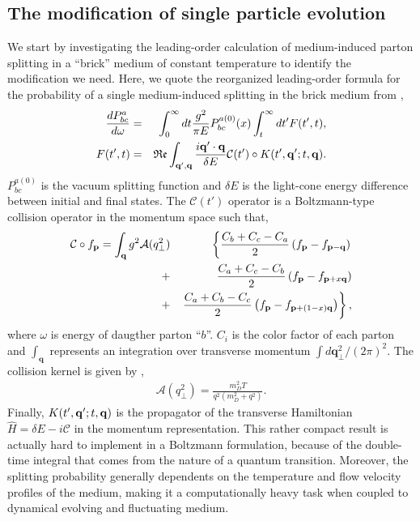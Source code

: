 \documentclass[aps, prc, reprint, amsmath, groupedaddress, nofootinbib]{revtex4-1}
\begin{document}
\subsection{The modification of single particle evolution}
We start by investigating the leading-order calculation of medium-induced parton splitting in a ``brick'' medium of constant temperature to identify the modification we need.
Here, we quote the reorganized leading-order formula for the probability of a single medium-induced splitting in the brick medium from \cite{CaronHuot:2010bp},
\begin{eqnarray}
\frac{dP^{a}_{bc}}{d\omega} &=& \int_0^\infty dt \frac{g^2}{\pi E} P_{bc}^{a(0)}(x) \int_t^\infty dt'  F(t', t),
\label{eq:full-theory}
\\
F(t', t) &=& \mathfrak{Re} \int_{{\bf q}', {\bf q}} \frac{i {\bf q}'\cdot {\bf q}}{\delta E} \mathcal{C}(t') \circ K(t', {\bf q}'; t, {\bf q}).
\end{eqnarray}
$P_{bc}^{a(0)}$ is the vacuum splitting function and $\delta E$ is the light-cone energy difference between initial and final states. 
The $\mathcal{C}(t')$ operator is a Boltzmann-type collision operator in the momentum space such that,
\begin{eqnarray}
\mathcal{C}\circ f_{\mathbf{p}} = \int_{\bf q} g^2\mathcal{A}(q_\perp^2)
&&\left\{  \frac{C_b+C_c-C_a}{2}\left(f_{\bf p}-f_{{\bf p}-{\bf q}}\right) \right.\\\nonumber
 +&&    \frac{C_a+C_c-C_b}{2}\left(f_{\bf p}-f_{{\bf p}+x{\bf q}}\right) \\\nonumber
+&&  \left. \frac{C_a+C_b-C_c}{2}\left(f_{\bf p}-f_{{\bf p}+(1-x){\bf q}}\right)\right\},
\end{eqnarray}
where $\omega$ is energy of daugther parton ``$b$''.
$C_i$ is the color factor of each parton and $\int_{\mathbf{q}}$ represents an integration over transverse momentum $\int d\mathbf{q}_\perp^2/(2\pi)^2$.
The collision kernel is given by \cite{Aurenche:2002pd},
\begin{eqnarray}
\mathcal{A}(q_\perp^2) = \frac{m_D^2 T}{q^2\left(m_D^2+q^2\right)}.
\label{eq:kernel}
\end{eqnarray}
Finally, $K(t', {\bf q}'; t, {\bf q})$ is the propagator of the transverse  Hamiltonian $\hat{H} = \delta E - i\mathcal{C}$ in the momentum representation.
This rather compact result is actually hard to implement in a Boltzmann formulation, because of the double-time integral that comes from the nature of a quantum transition.
Moreover, the splitting probability generally dependents on the temperature and flow velocity profiles of the medium, making it a computationally heavy task when coupled to dynamical evolving and fluctuating medium.
\end{document}
